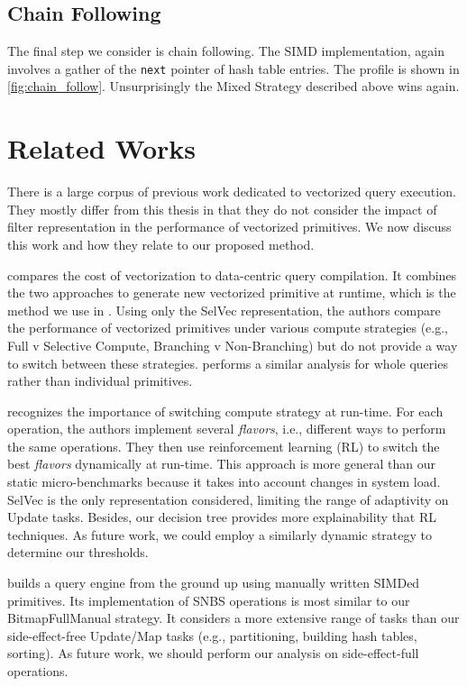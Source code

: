 \documentclass[12pt]{cmuthesis}
\begin{document}
\section{Chain Following}
The final step we consider is chain following. The SIMD implementation, again involves a gather of the \texttt{next} pointer of hash table entries. The profile is shown in \cref{fig:chain_follow}. Unsurprisingly the Mixed Strategy described above wins again.
\fi

\chapter{Related Works}
There is a large corpus of previous work dedicated to vectorized query execution. They mostly differ from this thesis in that they do not consider the impact of filter representation in the performance of vectorized primitives. We now discuss this work and how they relate to our proposed method.
 
\cite{sompolski_vec} compares the cost of vectorization to data-centric query compilation. It combines the two approaches to generate new vectorized primitive at runtime, which is the method we use in . Using only the SelVec representation, the authors compare the performance of vectorized primitives under various compute strategies (e.g., Full v Selective Compute, Branching v Non-Branching) but do not provide a way to switch between these strategies. \cite{everything_vectorized} performs a similar analysis for whole queries rather than individual primitives.

\cite{miro_adapt} recognizes the importance of switching compute strategy at run-time. For each operation, the authors implement several \textit{flavors}, i.e., different ways to perform the same operations. They then use reinforcement learning (RL) to switch the best \textit{flavors} dynamically at run-time. This approach is more general than our static micro-benchmarks because it takes into account changes in system load. SelVec is the only representation considered, limiting the range of adaptivity on Update tasks. Besides, our decision tree provides more explainability that RL techniques. As future work, we could employ a similarly dynamic strategy to determine our thresholds.

\cite{orestis_bitmap} builds a query engine from the ground up using manually written SIMDed primitives. Its implementation of SNBS operations is most similar to our BitmapFullManual strategy. It considers a more extensive range of tasks than our side-effect-free Update/Map tasks (e.g., partitioning, building hash tables, sorting). As future work, we should perform our analysis on side-effect-full operations.
 
\end{document}
